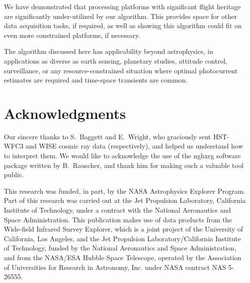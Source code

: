 \documentclass{ws-jai}
\begin{document}
We have demonstrated that processing platforms with significant flight
heritage are significantly under-utilized by our algorithm.  This
provides space for other data acquisition tasks, if required, as well
as showing this algorithm could fit on even more constrained
platforms, if necessary.

The algorithm discussed here has applicability beyond astrophysics, in
applications as diverse as earth sensing, planetary studies, attitude
control, surveillance, or any resource-constrained situation where
optimal photocurrent estimates are required and time-space transients
are common.  


\section*{Acknowledgments}

Our sincere thanks to S.~Baggett and E.~Wright, who graciously sent
HST-WFC3 and WISE cosmic ray data (respectively), and helped us
understand how to interpret them.  We would like to acknowledge the
use of the {\sc nghxrg} software package written by B.~Rauscher, and
thank him for making such a valuable tool public.

This research was funded, in part, by the NASA Astrophysics Explorer
Program.  Part of this research was carried out at the Jet Propulsion
Laboratory, California Institute of Technology, under a contract with
the National Aeronautics and Space Administration.  This publication
makes use of data products from the Wide-field Infrared Survey
Explorer, which is a joint project of the University of California,
Los Angeles, and the Jet Propulsion Laboratory/California Institute of
Technology, funded by the National Aeronautics and Space
Administration, and from the NASA/ESA Hubble Space Telescope, operated
by the Association of Universities for Research in Astronomy,
Inc. under NASA contract NAS 5-26555.


\end{document}
